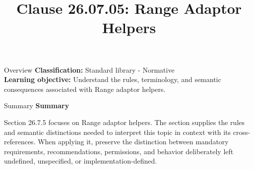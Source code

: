 \documentclass[10pt,letterpaper]{article}
\title{Clause 26.07.05: Range Adaptor Helpers}
\author{}
\date{}
\begin{document}
\maketitle
\begin{CornellOverviewBox}{Overview}
\textbf{Classification:} Standard library - Normative\\[2pt]
\textbf{Learning objective:} Understand the rules, terminology, and semantic consequences associated with Range adaptor helpers.
\end{CornellOverviewBox}\begin{CornellSummaryBox}{Summary}
{\sffamily\bfseries\color{Accent} Summary}\par\vspace{3pt}Section 26.7.5 focuses on Range adaptor helpers. The section supplies the rules and semantic distinctions needed to interpret this topic in context with its cross-references. When applying it, preserve the distinction between mandatory requirements, recommendations, permissions, and behavior deliberately left undefined, unspecified, or implementation-defined.
\end{CornellSummaryBox}
\end{document}
